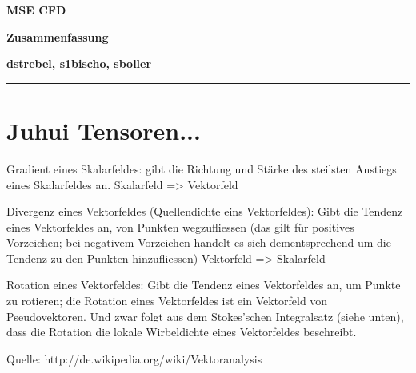 \documentclass[a4paper]{scrartcl}
\begin{document}
\pagestyle{fancy}
\setlength{\footskip}{10mm}
\fancyhf{}
\renewcommand{\headrulewidth}{0pt}
\renewcommand{\footrulewidth}{0.5pt}

 \centerline{\LARGE \bf \textsf{MSE CFD}} 
 \smallskip
\centerline{\Large \bf \textsf {Zusammenfassung}}
\medskip
  \centerline{\bf \textsf{dstrebel, s1bischo, sboller }}

 \smallskip \noindent\rule{\textwidth}{0.5pt}
\smallskip%



\section{Juhui Tensoren...}

Gradient eines Skalarfeldes: gibt die Richtung und Stärke des steilsten Anstiegs eines Skalarfeldes an.
Skalarfeld => Vektorfeld

Divergenz eines Vektorfeldes (Quellendichte eins Vektorfeldes): Gibt die Tendenz eines Vektorfeldes an, von Punkten wegzufliessen (das gilt für positives Vorzeichen; bei negativem Vorzeichen handelt es sich dementsprechend um die Tendenz zu den Punkten hinzufliessen)
Vektorfeld => Skalarfeld

Rotation eines Vektorfeldes: Gibt die Tendenz eines Vektorfeldes an, um Punkte zu rotieren; die Rotation eines Vektorfeldes ist ein Vektorfeld von Pseudovektoren. Und zwar folgt aus dem Stokes’schen Integralsatz (siehe unten), dass die Rotation die lokale Wirbeldichte eines Vektorfeldes beschreibt.

Quelle: http://de.wikipedia.org/wiki/Vektoranalysis
\end{document}
